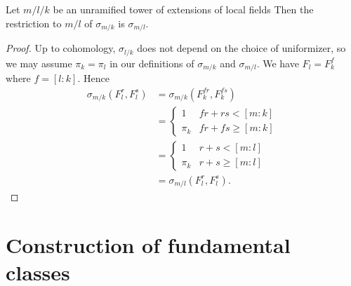 \begin{lemma}
	Let $m / l / k$ be an unramified tower of extensions of local fields
	Then the restriction to $m/l$ of $\sigma_{m/k}$ is $\sigma_{m/l}$.
\end{lemma}

\begin{proof}
	Up to cohomology, $\sigma_{l/k}$ does not depend on the choice of
	uniformizer, so we may assume $\pi_k=\pi_l$
	in our definitions of $\sigma_{m/k}$ and $\sigma_{m/l}$.
	We have $F_l = F_k^f$ where $f = [l:k]$.
	Hence
	\begin{align*}
		\sigma_{m/k}(F_l^r, F_l^s)
		&=
		\sigma_{m/k}(F_k^{fr}, F_k^{fs})\\
		&=
		\begin{cases}
			1 & fr + rs < [m:k] \\
			\pi_k & fr + fs \ge [m:k]
		\end{cases}\\
		&=
		\begin{cases}
			1 & r + s < [m:l] \\
			\pi_k & r + s \ge [m:l]
		\end{cases}\\
		&=\sigma_{m/l}(F_l^r,F_l^s).
	\end{align*}
\end{proof}






\section{Construction of fundamental classes}


